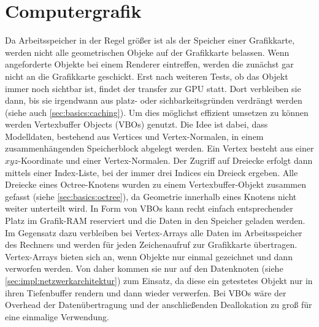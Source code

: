 \section{Computergrafik}
\label{sec:basics:computergrafik}
Da Arbeitsspeicher in der Regel größer ist als der Speicher einer Grafikkarte, werden nicht alle geometrischen Objeke auf der Grafikkarte belassen. Wenn angeforderte Objekte bei einem Renderer eintreffen, werden die zunächst gar nicht an die Grafikkarte geschickt. Erst nach weiteren Tests, ob das Objekt immer noch sichtbar ist, findet der transfer zur GPU statt. Dort verbleiben sie dann, bis sie irgendwann aus platz- oder sichbarkeitsgründen verdrängt werden (siehe auch \ref{sec:basics:caching}). Um dies möglichst effizient umsetzen zu können werden Vertexbuffer Objects  (VBOs) genutzt. Die Idee ist dabei, dass Modelldaten, bestehend aus Vertices und Vertex-Normalen, in einem zusammenhängenden Speicherblock abgelegt werden. Ein Vertex besteht aus einer $xyz$-Koordinate und einer Vertex-Normalen. Der Zugriff auf Dreiecke erfolgt dann mittels einer Index-Liste, bei der immer drei Indices ein Dreieck ergeben. Alle Dreiecke eines Octree-Knotens wurden zu einem Vertexbuffer-Objekt zusammen gefasst (siehe \ref{sec:basics:octree}), da Geometrie innerhalb eines Knotens nicht weiter unterteilt wird. In Form von VBOs kann recht einfach entsprechender Platz im Grafik-RAM reserviert und die Daten in den Speicher geladen werden.\\
Im Gegensatz dazu verbleiben bei Vertex-Arrays alle Daten im Arbeitsspeicher des Rechners und werden für jeden Zeichenaufruf zur Grafikkarte übertragen. Vertex-Arrays bieten sich an, wenn Objekte nur einmal gezeichnet und dann verworfen werden. Von daher kommen sie nur auf den Datenknoten (siehe \ref{sec:impl:netzwerkarchitektur}) zum Einsatz, da diese ein getestetes Objekt nur in ihren Tiefenbuffer rendern und dann wieder verwerfen. Bei VBOs wäre der Overhead der Datenübertragung und der anschließenden Deallokation zu groß für eine einmalige Verwendung.

